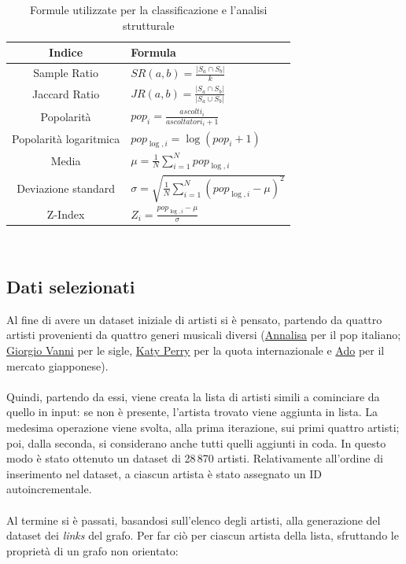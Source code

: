 \documentclass[sigchi]{acmart}
\begin{document}
\begin{table}[H]
\centering
\small
\begin{tabular}{|c|>{\centering\arraybackslash}p{4cm}|}
\hline
\textbf{Indice} & \textbf{Formula} \\
\hline
Sample Ratio &
$SR(a, b) = \frac{|S_a \cap S_b|}{k}$ \\
\hline
Jaccard Ratio &
$JR(a, b) = \frac{|S_a \cap S_b|}{|S_a \cup S_b|}$ \\
\hline
Popolarità &
$pop_i = \frac{ascolti_i}{ascoltatori_i + 1}$ \\
\hline
Popolarità logaritmica &
$pop_{\log,i} = \log(pop_i + 1)$ \\
\hline
Media &
$\mu = \frac{1}{N} \sum_{i=1}^{N} pop_{\log,i}$ \\
\hline
Deviazione standard &
$\sigma = \sqrt{\frac{1}{N} \sum_{i=1}^{N} (pop_{\log,i} - \mu)^2}$ \\
\hline
Z-Index &
$Z_i = \frac{pop_{\log,i} - \mu}{\sigma}$ \\
\hline
\end{tabular}\\[15pt]
\caption{Formule utilizzate per la classificazione e l'analisi strutturale}
\end{table}


\subsection{Dati selezionati}

Al fine di avere un dataset iniziale di artisti si è pensato, partendo da quattro artisti provenienti da quattro generi musicali diversi (\href{https://www.last.fm/music/Annalisa}{Annalisa} per il pop italiano; \href{https://www.last.fm/music/Giorgio+Vanni}{Giorgio Vanni} per le sigle, \href{https://www.last.fm/music/Katy+Perry}{Katy Perry} per la quota internazionale e \href{https://www.last.fm/music/Ado}{Ado} per il mercato giapponese). \\ \\ Quindi, partendo da essi, viene creata la lista di artisti simili a cominciare da quello in input: se non è presente, l'artista trovato viene aggiunta in lista. La medesima operazione viene svolta, alla prima iterazione, sui primi quattro artisti; poi, dalla seconda, si considerano anche tutti quelli aggiunti in coda. In questo modo è stato ottenuto un dataset di 28\,870 artisti. Relativamente all'ordine di inserimento nel dataset, a ciascun artista è stato assegnato un ID autoincrementale. \\ \\ Al termine si è passati, basandosi sull'elenco degli artisti, alla generazione del dataset dei {\itshape links} del grafo. Per far ciò per ciascun artista della lista, sfruttando le proprietà di un grafo non orientato:
\end{document}
